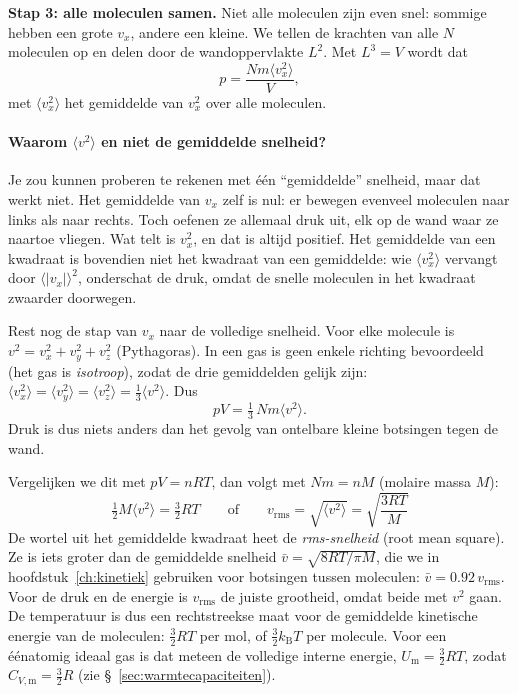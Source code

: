 \textbf{Stap 3: alle moleculen samen.} Niet alle moleculen zijn even snel: sommige hebben een grote $v_x$, andere een kleine. We tellen de krachten van alle $N$ moleculen op en delen door de wandoppervlakte $L^2$. Met $L^3 = V$ wordt dat
\[
p = \frac{Nm\langle v_x^2\rangle}{V},
\]
met $\langle v_x^2\rangle$ het gemiddelde van $v_x^2$ over alle moleculen.

\paragraph{Waarom $\langle v^2\rangle$ en niet de gemiddelde snelheid?}
Je zou kunnen proberen te rekenen met \'e\'en ``gemiddelde'' snelheid, maar dat werkt niet. Het gemiddelde van $v_x$ zelf is nul: er bewegen evenveel moleculen naar links als naar rechts. Toch oefenen ze allemaal druk uit, elk op de wand waar ze naartoe vliegen. Wat telt is $v_x^2$, en dat is altijd positief. Het gemiddelde van een kwadraat is bovendien niet het kwadraat van een gemiddelde: wie $\langle v_x^2\rangle$ vervangt door $\langle |v_x|\rangle^2$, onderschat de druk, omdat de snelle moleculen in het kwadraat zwaarder doorwegen.

Rest nog de stap van $v_x$ naar de volledige snelheid. Voor elke molecule is $v^2 = v_x^2 + v_y^2 + v_z^2$ (Pythagoras). In een gas is geen enkele richting bevoordeeld (het gas is \emph{isotroop}), zodat de drie gemiddelden gelijk zijn: $\langle v_x^2\rangle = \langle v_y^2\rangle = \langle v_z^2\rangle = \tfrac{1}{3}\langle v^2\rangle$. Dus
\begin{equation}
pV = \tfrac{1}{3}\,N m \langle v^2\rangle .
\label{eq:kmt-druk}
\end{equation}
Druk is dus niets anders dan het gevolg van ontelbare kleine botsingen tegen de wand.

Vergelijken we dit met $pV = nRT$, dan volgt met $Nm = nM$ (molaire massa $M$):
\begin{equation}
\boxed{\tfrac{1}{2}M\langle v^2\rangle = \tfrac{3}{2}RT}
\qquad\text{of}\qquad
\boxed{v_\mathrm{rms} = \sqrt{\langle v^2\rangle} = \sqrt{\frac{3RT}{M}}}
\label{eq:vrms}
\end{equation}
De wortel uit het gemiddelde kwadraat heet de \emph{rms-snelheid} (root mean square). Ze is iets groter dan de gemiddelde snelheid $\bar v = \sqrt{8RT/\pi M}$, die we in hoofdstuk~\ref{ch:kinetiek} gebruiken voor botsingen tussen moleculen: $\bar v = 0.92\,v_\mathrm{rms}$. Voor de druk en de energie is $v_\mathrm{rms}$ de juiste grootheid, omdat beide met $v^2$ gaan. De temperatuur is dus een rechtstreekse maat voor de gemiddelde kinetische energie van de moleculen: $\tfrac{3}{2}RT$ per mol, of $\tfrac{3}{2}k_\mathrm{B}T$ per molecule. Voor een \'e\'enatomig ideaal gas is dat meteen de volledige interne energie, $U_\mathrm{m} = \tfrac{3}{2}RT$, zodat $C_{V,\mathrm{m}} = \tfrac{3}{2}R$ (zie \S~\ref{sec:warmtecapaciteiten}).

